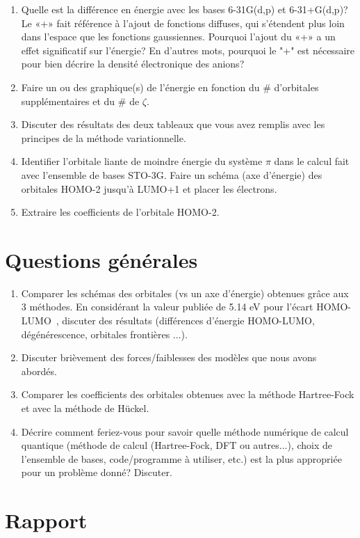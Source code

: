 \documentclass[12pt,letterpaper]{article}
\begin{document}
\begin{enumerate}[resume]
\item Quelle est la différence en énergie avec les bases 6-31G(d,p) et 6-31+G(d,p)? Le «+» fait référence à l'ajout de fonctions diffuses, qui s'étendent plus loin dans l'espace que les fonctions gaussiennes. Pourquoi l'ajout du «+» a un effet significatif sur l'énergie? En d'autres mots, pourquoi le "+" est nécessaire pour bien décrire la densité électronique des anions?
\item Faire un ou des graphique(s) de l'énergie en fonction du \# d'orbitales supplémentaires et du \# de $\zeta$.
\item Discuter des résultats des deux tableaux que vous avez remplis avec les principes de la méthode variationnelle.
\item Identifier l'orbitale liante de moindre énergie du système $\pi$ dans le calcul fait avec l'ensemble de bases STO-3G. Faire un schéma (axe d'énergie) des orbitales HOMO-2 jusqu'à LUMO+1 et placer les électrons.
\item Extraire les coefficients de l'orbitale HOMO-2.
\end{enumerate}

\section*{Questions générales}
\begin{enumerate}[resume]
\item Comparer les schémas des orbitales (vs un axe d'énergie) obtenues grâce aux 3 méthodes. En considérant la valeur publiée de 5.14 eV pour l'écart HOMO-LUMO~\cite{doi:10.1021/om00036a047}, discuter des résultats (différences d'énergie HOMO-LUMO, dégénérescence, orbitales frontières ...).
\item Discuter brièvement des forces/faiblesses des modèles que nous avons abordés.
\item Comparer les coefficients des orbitales obtenues avec la méthode Hartree-Fock et avec la méthode de Hückel.
\item Décrire comment feriez-vous pour savoir quelle méthode numérique de calcul quantique (méthode de calcul (Hartree-Fock, DFT ou autres...), choix de l'ensemble de bases, code/programme à utiliser, etc.) est la plus appropriée pour un problème donné? Discuter.
\end{enumerate}

\section*{Rapport}
\end{document}
